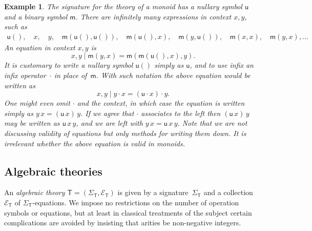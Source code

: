 \documentclass{amsart}
\newcommand{\theory}[1]{\mathsf{#1}} %
\newcommand{\signature}[1]{\Sigma_{\theory{#1}}} %
\newcommand{\equations}[1]{\mathcal{E}_{\theory{#1}}} %
\newtheorem{example}[definition]{Example}
\begin{document}
\begin{example}
  \label{ex:monoid-signature}
  The signature for the theory of a monoid has a nullary symbol $\mathsf{u}$ and a binary
  symbol $\mathsf{m}$. There are infinitely many expressions in context $x, y$, such as
  \begin{align*}
    \mathsf{u}(),\quad
    x,\quad
    y,\quad
    \mathsf{m}(\mathsf{u}(), \mathsf{u}()),\quad
    \mathsf{m}(\mathsf{u}(), x),\quad
    \mathsf{m}(y, \mathsf{u}()),\quad
    \mathsf{m}(x, x),\quad
    \mathsf{m}(y, x),
    \ldots
  \end{align*}
  An equation in context $x, y$ is
  \begin{equation*}
    x, y \mid \mathsf{m}(y, x) = \mathsf{m}(\mathsf{m}(\mathsf{u}(), x), y).
  \end{equation*}
  It is customary to write a nullary symbol $\mathsf{u}()$ simply as $\mathsf{u}$, and to
  use infix an infix operator~$\cdot$ in place of~$\mathsf{m}$. With such notation the
  above equation would be written as
  \begin{equation*}
    x, y \mid y \cdot x = (\mathsf{u} \cdot x) \cdot y.
  \end{equation*}
  One might even omit $\cdot$ and the context, in which case the equation is written
  simply as $y \, x = (\mathsf{u} \, x) \, y$. If we agree that $\cdot$ associates to the
  left then $(\mathsf{u} \, x) \, y$ may be written as $\mathsf{u} \, x \, y$, and we are
  left with $y \, x = \mathsf{u} \, x \, y$. Note that we are \emph{not} discussing
  validity of equations but only methods for writing them down. It is irrelevant whether
  the above equation is valid in monoids.
\end{example}


\subsection{Algebraic theories}
\label{sec:algebraic-theories-1}

An \emph{algebraic theory $\theory{T} = (\signature{T}, \equations{T})$} is given by a
signature~$\signature{T}$ and a collection $\equations{T}$ of $\signature{T}$-equations.
%
We impose no restrictions on the number of operation symbols or equations, but at least in
classical treatments of the subject certain complications are avoided by insisting that
arities be non-negative integers.
\end{document}

